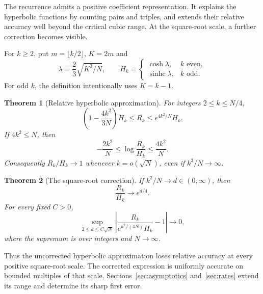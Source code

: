 \documentclass[11pt]{article}
\newtheorem{theorem}{Theorem}[section]
\theoremstyle{definition}
\theoremstyle{remark}
\newcommand{\1}{\mathbf 1}
\newcommand{\shc}{\operatorname{sinhc}}
\begin{document}
The recurrence admits a positive coefficient representation. It explains the hyperbolic functions by counting pairs and triples, and extends their relative accuracy well beyond the critical cubic range. At the square-root scale, a further correction becomes visible.

For $k\ge2$, put $m=\lfloor k/2\rfloor$, $K=2m$ and
\begin{equation}\label{eq:hyperdef}
\lambda=\frac23\sqrt{K^3/N},\qquad
H_k=\begin{cases}\cosh\lambda,&k\text{ even},\\
\shc\lambda,&k\text{ odd}.
\end{cases}
\end{equation}
For odd $k$, the definition intentionally uses $K=k-1$.



\begin{theorem}[Relative hyperbolic approximation]\label{thm:window}
For integers $2\le k\le N/4$,
\begin{equation}\label{eq:envelope}
\left(1-\frac{4k^2}{3N}\right)H_k
\le R_k\le e^{4k^2/N}H_k.
\end{equation}
If $4k^2\le N$, then
\begin{equation}\label{eq:logerror}
-\frac{2k^2}N\le\log\frac{R_k}{H_k}\le\frac{4k^2}N.
\end{equation}
Consequently $R_k/H_k\to1$ whenever $k=o(\sqrt N)$, even if $k^3/N\to\infty$.
\end{theorem}

\begin{theorem}[The square-root correction]\label{thm:sqrt}
If $k^2/N\to d\in(0,\infty)$, then
\begin{equation}\label{eq:sqrtlimit}
\frac{R_k}{H_k}\longrightarrow e^{d/4}.
\end{equation}
For every fixed $C>0$,
\begin{equation}\label{eq:uniformsqrt}
\sup_{2\le k\le C\sqrt N}
\left|\frac{R_k}{e^{k^2/(4N)}H_k}-1\right|\longrightarrow0,
\end{equation}
where the supremum is over integers and $N\to\infty$.
\end{theorem}

Thus the uncorrected hyperbolic approximation loses relative accuracy at every positive square-root scale. The corrected expression is uniformly accurate on bounded multiples of that scale. Sections~\ref{sec:asymptotics} and~\ref{sec:rates} extend its range and determine its sharp first error.
\end{document}
